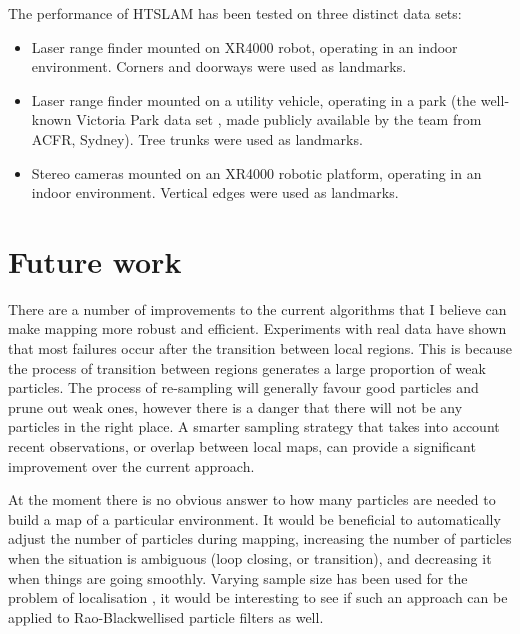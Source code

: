 The performance of HTSLAM has been tested on three distinct data sets:

\begin{itemize}
\item Laser range finder mounted on XR4000 robot, operating in an indoor
environment. Corners and doorways were used as landmarks.

\item Laser range finder mounted on a utility vehicle, operating in a
  park (the well-known Victoria Park data set \cite{VP_dataset}, made
  publicly available by the team from ACFR, Sydney). Tree trunks were
  used as landmarks.

\item Stereo cameras mounted on an XR4000 robotic platform, operating
  in an indoor environment. Vertical edges were used as landmarks.

\end{itemize}



\section{Future work}

There are a number of improvements to the current algorithms that I
believe can make mapping more robust and efficient. Experiments with
real data have shown that most failures occur after the transition
between local regions. This is because the process of transition
between regions generates a large proportion of weak particles. The
process of re-sampling will generally favour good particles and prune
out weak ones, however there is a danger that there will not be any
particles in the right place. A smarter sampling strategy that takes
into account recent observations, or overlap between local maps, can
provide a significant improvement over the current approach.

At the moment there is no obvious answer to how many particles are
needed to build a map of a particular environment. It would be
beneficial to automatically adjust the number of particles during
mapping, increasing the number of particles when the situation is
ambiguous (loop closing, or transition), and decreasing it when things
are going smoothly. Varying sample size has been used for the problem
of localisation \cite{KLDSampling}, it would be interesting to see if
such an approach can be applied to Rao-Blackwellised particle filters
as well.


